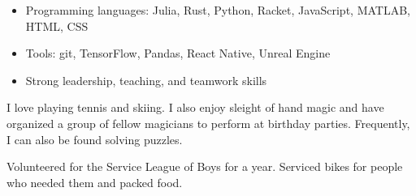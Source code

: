 \documentclass[9pt]{developercv} %
\begin{document}
\begin{itemize}[noitemsep, topsep=0pt]
	\item Programming languages: Julia, Rust, Python, Racket, JavaScript, MATLAB, HTML, CSS
	\item Tools: git, TensorFlow, Pandas, React Native, Unreal Engine 
	\item Strong leadership, teaching, and teamwork skills
\end{itemize}

\vspace{0.4cm}
\begin{minipage}[t]{0.6\textwidth}
	\vspace{-\baselineskip} %
	
	I love playing tennis and skiing. I also enjoy sleight of hand magic and have organized a group of fellow magicians to perform at birthday parties.
	Frequently, I can also be found solving puzzles. 
\end{minipage}
\hfill
\begin{minipage}[t]{0.35\textwidth}
	\vspace{-\baselineskip} %
	
	Volunteered for the Service League of Boys for a year. Serviced bikes for people who needed them and packed food. 
\end{minipage}

\end{document}
